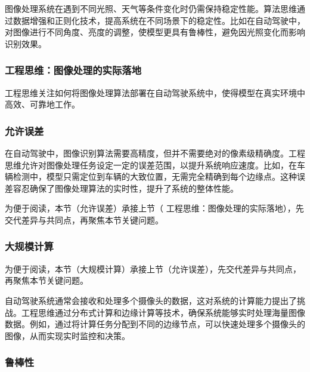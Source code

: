 图像处理系统在遇到不同光照、天气等条件变化时仍需保持稳定性能。算法思维通过数据增强和正则化技术，提高系统在不同场景下的稳定性。比如在自动驾驶中，对图像进行不同角度、亮度的调整，使模型更具有鲁棒性，避免因光照变化而影响识别效果。
\subsubsection{ 工程思维：图像处理的实际落地}



工程思维关注如何将图像处理算法部署在自动驾驶系统中，使得模型在真实环境中高效、可靠地工作。
\subsubsection*{允许误差}在自动驾驶中，图像识别算法需要高精度，但并不需要绝对的像素级精确度。工程思维允许对图像处理任务设定一定的误差范围，以提升系统响应速度。比如，在车辆检测中，模型只需定位到车辆的大致位置，无需完全精确到每个边缘点。这种误差容忍确保了图像处理算法的实时性，提升了系统的整体性能。


为便于阅读，本节（允许误差）承接上节（ 工程思维：图像处理的实际落地），先交代差异与共同点，再聚焦本节关键问题。

\subsubsection*{大规模计算}


为便于阅读，本节（大规模计算）承接上节（允许误差），先交代差异与共同点，再聚焦本节关键问题。

自动驾驶系统通常会接收和处理多个摄像头的数据，这对系统的计算能力提出了挑战。工程思维通过分布式计算和边缘计算等技术，确保系统能够实时处理海量图像数据。例如，通过将计算任务分配到不同的边缘节点，可以快速处理多个摄像头的图像，从而实现实时监控和决策。
\subsubsection*{鲁棒性}


